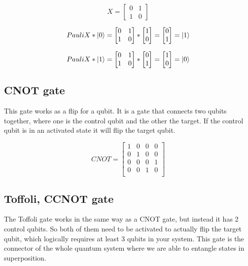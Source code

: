 \[
X=
\begin{bmatrix}
0 & 1 \\
1 & 0
\end{bmatrix}
\]

\[
PauliX * \ket{0}=
\begin{bmatrix}
0 & 1 \\
1 & 0
\end{bmatrix}
*
\begin{bmatrix}
1 \\
0
\end{bmatrix}
=
\begin{bmatrix}
0 \\
1
\end{bmatrix}
=
\ket{1}
\]

\[
PauliX * \ket{1}=
\begin{bmatrix}
0 & 1 \\
1 & 0
\end{bmatrix}
*
\begin{bmatrix}
0 \\
1
\end{bmatrix}
=
\begin{bmatrix}
1 \\
0
\end{bmatrix}
=
\ket{0}
\]
\subsection{CNOT gate}
This gate works as a flip for a qubit. It is a gate that connects two qubits together, where one is the control qubit and the other the target. If the control qubit is in an activated state it will flip the target qubit.

 \[
 CNOT=
 \begin{bmatrix}
 1 & 0 & 0 & 0 \\
 0 & 1 & 0 & 0 \\
 0 & 0 & 0 & 1 \\
 0 & 0 & 1 & 0 \\	
 \end{bmatrix}
 \]

\subsection{Toffoli, CCNOT gate}
The Toffoli gate works in the same way as a CNOT gate, but instead it has 2 control qubits. So both of them need to be activated to actually flip the target qubit, which logically requires at least 3 qubits in your system. This gate is the connector of the whole quantum system where we are able to entangle states in superposition.

